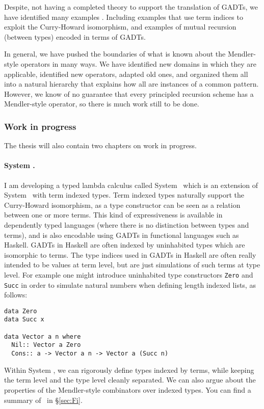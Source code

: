 Despite, not having a completed theory to support the translation of GADTs,
we have identified many examples \cite{AhnShe11}. Including examples
that use term indices to exploit the Curry-Howard isomorphism, and
examples of mutual recursion (between types) encoded in terms of GADTs.

In general, we have pushed the boundaries of what is known about
the Mendler-style operators in many ways. We have identified new domains
in which they are applicable, identified new operators, adapted old ones,
and organized them all into a natural hierarchy that explains how all are
instances of a common pattern. However, we know of no guarantee that every
principled recursion scheme has a Mendler-style operator, so there is
much work still to be done.


\subsubsection{Work in progress} \label{Fi}

The thesis will also contain two chapters on work in progress.

\paragraph{System \Fi.}
I am developing a typed lambda calculus called System \Fi\, which is an
extension of System \Fw\ with term indexed types. Term indexed types
naturally support the Curry-Howard isomorphism, as a type constructor can be
seen as a relation between one or more terms.  This kind of expressiveness is
available in dependently typed languages (where there is no distinction between
types and terms), and is also encodable using GADTs in functional languages
such as Haskell.  GADTs in Haskell are often indexed by uninhabited types
which are isomorphic to terms. The type indices used in GADTs in Haskell are
often really intended to be values at term level, but are just simulations of
such terms at type level.  For example one might introduce uninhabited type
constructors \verb+Zero+ and \verb+Succ+ in order to simulate natural numbers
when defining length indexed lists, as follows:
\begin{verbatim}
data Zero
data Succ x

data Vector a n where
  Nil:: Vector a Zero
  Cons:: a -> Vector a n -> Vector a (Succ n)
\end{verbatim}  

Within System \Fi, we can rigorously define types indexed by terms,
while keeping the term level and the type level cleanly separated.
We can also argue about the properties of the Mendler-style combinators
over indexed types.  You can find a summary of \Fi\ in \S\ref{sec:Fi}.

